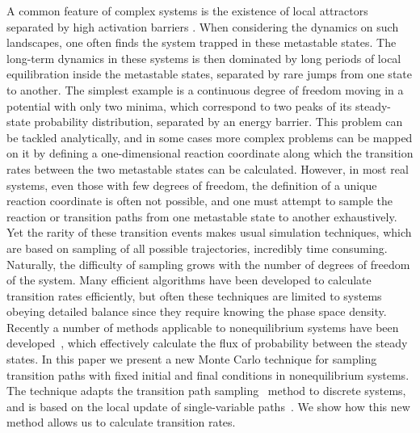 \documentclass[aps,twocolumn,floats,pre,amsmath,superscriptaddress]{revtex4}
\newcommand{\<}{\langle}
\renewcommand{\>}{\rangle}
\begin{document}
A common feature of complex systems is the existence of local attractors separated by high activation barriers \cite{hangii_review, valerianirev}. 
When considering the dynamics on such landscapes, one often finds the system trapped in these metastable states. 
The long-term dynamics in these systems is then dominated by long periods of local equilibration inside the metastable states, separated by rare jumps from one state to another. 
The simplest example is a continuous degree of freedom moving in a potential with only two minima, 
which correspond to two peaks of its steady-state probability distribution, separated by an energy barrier.
This problem can be tackled analytically, and in some cases more complex problems can be mapped on it
by defining a one-dimensional reaction coordinate along which the 
transition rates between the two metastable states can be calculated. However, in most real systems, even those with few degrees of freedom, 
the definition of a unique reaction coordinate is often not possible, 
and one must attempt to sample the reaction or transition paths from one metastable state to another exhaustively. 
Yet the rarity of these transition events makes usual simulation techniques, 
which are based on sampling of all possible trajectories, incredibly time consuming. 
Naturally, the difficulty of sampling grows with the number of degrees of freedom of the system. 
Many efficient algorithms have been developed to calculate transition rates efficiently, 
but often these techniques \cite{bennet, dinner} are limited to systems obeying detailed 
balance since they require knowing the phase space density. 
Recently a number of methods applicable to nonequilibrium systems have been 
developed~\cite{valerianirev, chandler, dellago2, tenwoldeffs, weinane_erik, erik2, kurchan1, kurchan2, picciani}, which effectively calculate 
the flux of probability between the steady states. In this paper we present a new Monte Carlo 
technique for sampling transition paths with fixed initial and final
conditions in nonequilibrium systems. The technique
adapts the transition path sampling~\cite{chandler, dellago2} method to discrete systems, 
and is based on the local update of single-variable paths~\cite{francescoprb}. 
We show how this new method allows us to calculate transition rates.
\end{document}
